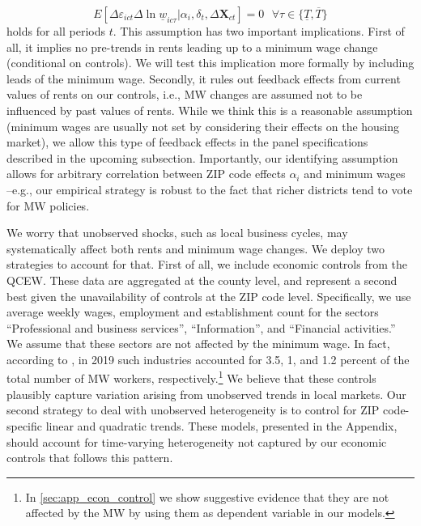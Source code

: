 \begin{equation*}
	E[\Delta \varepsilon_{ict} \Delta \ln \underline{w}_{ic\tau}  
							| \alpha_i, \delta_t, \Delta \mathbf{X}_{ct}] = 0
	\ \ \ \forall \tau \in \{\underline{T}, \overline{T} \}
\end{equation*}
holds for all periods $t$. This assumption has two important implications. First of all, 
it implies no pre-trends in rents leading up to a minimum wage change (conditional on 
controls). We will test this implication more formally by including leads of the minimum 
wage. Secondly, it rules out feedback effects from current values of rents on our controls, 
i.e., MW changes are assumed not to be influenced by past values of rents. While we think 
this is a reasonable assumption (minimum wages are usually not set by considering their 
effects on the housing market), we allow this type of feedback effects in the panel 
specifications described in the upcoming subsection. Importantly, our identifying assumption 
allows for arbitrary correlation between ZIP code effects $\alpha_i$ and minimum wages 
--e.g., our empirical strategy is robust to the fact that richer districts tend to vote 
for MW policies.


We worry that unobserved shocks, such as local business cycles, may systematically affect 
both rents and minimum wage changes. We deploy two strategies to account for that. First 
of all, we include economic controls from the QCEW. 
These data are aggregated at the county level, and represent a second best given the 
unavailability of controls at the ZIP code level. Specifically, we use average weekly wages, 
employment and establishment count for the sectors ``Professional and business services'', 
``Information'', and ``Financial activities.'' We assume that these sectors are not affected 
by the minimum wage. In fact, according to \textcite[][table 5]{MinWorkersReportBLS}, in 2019 
such industries accounted for 3.5, 1, and 1.2 percent of the total number of MW workers, 
respectively.\footnote{In \autoref{sec:app_econ_control} we show suggestive evidence 
	that they are not affected by the MW by using them as dependent variable in our models.}
We believe that these controls plausibly capture variation arising from unobserved trends 
in local markets. Our second strategy to deal with unobserved heterogeneity is to control for
ZIP code-specific linear and quadratic trends. These models, presented in the Appendix, 
should account for time-varying heterogeneity not captured by our economic controls that 
follows this pattern.


